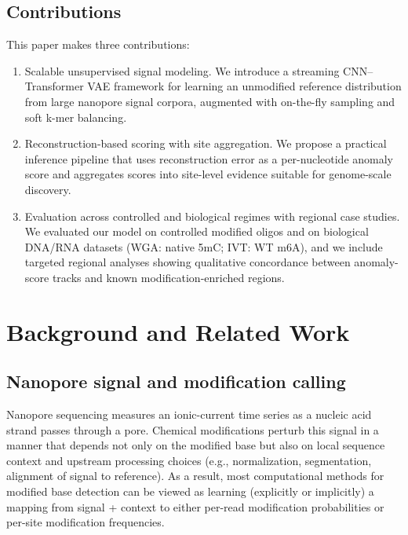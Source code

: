 \documentclass[sigconf, review]{acmart}
\begin{document}
\subsection{Contributions}
This paper makes three contributions:
\begin{enumerate}
    \item Scalable unsupervised signal modeling. We introduce a streaming CNN--Transformer VAE framework for learning an unmodified reference distribution from large nanopore signal corpora, augmented with on-the-fly sampling and soft k-mer balancing.
    \item Reconstruction-based scoring with site aggregation. We propose a practical inference pipeline that uses reconstruction error as a per-nucleotide anomaly score and aggregates scores into site-level evidence suitable for genome-scale discovery.
    \item Evaluation across controlled and biological regimes with regional case studies. We evaluated our model on controlled modified oligos and on biological DNA/RNA datasets (WGA: native 5mC; IVT: WT m6A), and we include targeted regional analyses showing qualitative concordance between anomaly-score tracks and known modification-enriched regions.
\end{enumerate}

\section{Background and Related Work}
\subsection{Nanopore signal and modification calling}
Nanopore sequencing measures an ionic-current time series as a nucleic acid strand passes through a pore. Chemical modifications perturb this signal in a manner that depends not only on the modified base but also on local sequence context and upstream processing choices (e.g., normalization, segmentation, alignment of signal to reference). As a result, most computational methods for modified base detection can be viewed as learning (explicitly or implicitly) a mapping from signal + context to either per-read modification probabilities or per-site modification frequencies.
\end{document}
